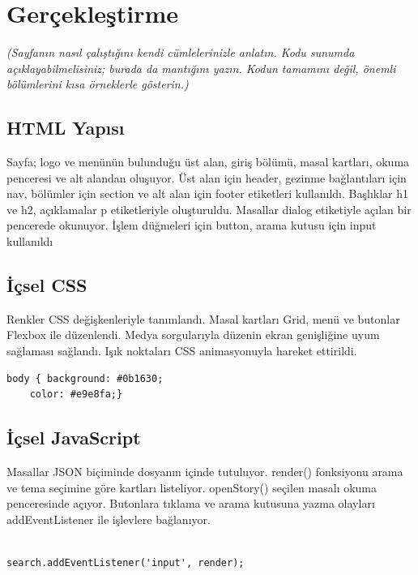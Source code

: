 \documentclass[12pt,a4paper]{article}
\newcommand{\aciklama}[1]{{\color{gray}\itshape (#1)}}
\begin{document}
\clearpage
\section{Gerçekleştirme}
\aciklama{Sayfanın nasıl çalıştığını kendi cümlelerinizle anlatın. Kodu sunumda
açıklayabilmelisiniz; burada da mantığını yazın. Kodun tamamını değil, önemli
bölümlerini kısa örneklerle gösterin.}

\subsection{HTML Yapısı}
Sayfa; logo ve menünün bulunduğu üst alan, giriş bölümü,
masal kartları, okuma penceresi ve alt alandan oluşuyor.
Üst alan için header, gezinme bağlantıları için nav,
bölümler için section ve alt alan için footer etiketleri
kullanıldı. Başlıklar h1 ve h2, açıklamalar p etiketleriyle
oluşturuldu. Masallar dialog etiketiyle açılan bir
pencerede okunuyor. İşlem düğmeleri için button,
arama kutusu için input kullanıldı

\subsection{İçsel CSS}
Renkler CSS değişkenleriyle tanımlandı. Masal kartları
Grid, menü ve butonlar Flexbox ile düzenlendi.
Medya sorgularıyla düzenin ekran genişliğine uyum
sağlaması sağlandı. Işık noktaları CSS animasyonuyla
hareket ettirildi.

\begin{lstlisting}[caption={İçsel CSS örneği}]
body { background: #0b1630;
    color: #e9e8fa;}
\end{lstlisting}

\subsection{İçsel JavaScript}
Masallar JSON biçiminde dosyanın içinde tutuluyor.
render() fonksiyonu arama ve tema seçimine göre kartları
listeliyor. openStory() seçilen masalı okuma penceresinde
açıyor. Butonlara tıklama ve arama kutusuna yazma olayları
addEventListener ile işlevlere bağlanıyor.

\begin{lstlisting}[caption={İçsel JavaScript'ten önemli bir bölüm}]

search.addEventListener('input', render);
\end{lstlisting}
\end{document}
